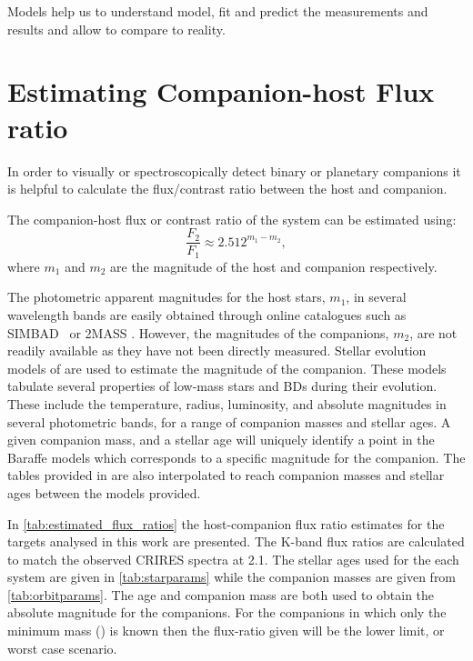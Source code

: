 
Models help us to understand model, fit and predict the measurements and results and allow to compare to reality.











\section{Estimating Companion-host Flux ratio}
\label{sec:compaion_flux_ratio}
In order to visually or spectroscopically detect binary or planetary companions it is helpful to calculate the flux/contrast ratio between the host and companion.

The companion-host flux or contrast ratio of the system can be estimated using:
\begin{equation}
\frac{F_{2}}{F_{1}} \approx 2.512^{m_{1} - m_{2}}, \label{eqn:mag_flux_ratios}
\end{equation}
where \(m_{1}\) and \(m_{2}\) are the magnitude of the host and companion respectively.

The photometric apparent magnitudes for the host stars, \(m_{1}\), in several wavelength bands are easily obtained through online catalogues such as {SIMBAD}~\citep{wenger_simbad_2000} or {2MASS} \citep{skrutskie_two_2006}.
However, the magnitudes of the companions, \(m_{2}\), are not readily available as they have not been directly measured.
Stellar evolution models of \citet{baraffe_evolutionary_2003, baraffe_new_2015} are used to estimate the magnitude of the companion.
These models tabulate several properties of low-mass stars and BDs during their evolution.
These include the temperature, radius, luminosity, and absolute magnitudes in several photometric bands, for a range of companion masses and stellar ages.
A given companion mass, and a stellar age will uniquely identify a point in the Baraffe models which corresponds to a specific magnitude for the companion.
The tables provided in \citet{baraffe_evolutionary_2003, baraffe_new_2015} are also interpolated to reach companion masses and stellar ages between the models provided.

In \cref{tab:estimated_flux_ratios} the host-companion flux ratio estimates for the targets analysed in this work are presented. The {K}-band flux ratios are calculated to match the observed {CRIRES} spectra at 2.1\um{}. The stellar ages used for the each system are given in \cref{tab:starparams} while the companion masses are given from \cref{tab:orbitparams}. The age and companion mass are both used to obtain the absolute magnitude for the companions. For the companions in which only the minimum mass (\mtwosini{}) is known then the flux-ratio given will be the lower limit, or worst case scenario.

